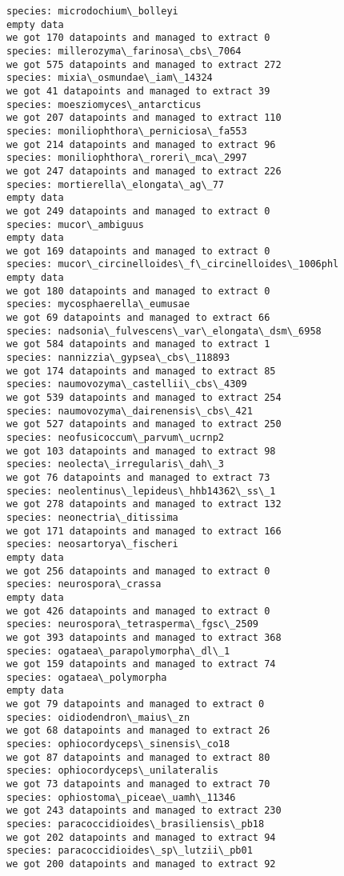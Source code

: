 \documentclass[11pt]{article}
\begin{document}
\begin{Verbatim}[commandchars=\\\{\}]
species: microdochium\_bolleyi
empty data
we got 170 datapoints and managed to extract 0
species: millerozyma\_farinosa\_cbs\_7064
we got 575 datapoints and managed to extract 272
species: mixia\_osmundae\_iam\_14324
we got 41 datapoints and managed to extract 39
species: moesziomyces\_antarcticus
we got 207 datapoints and managed to extract 110
species: moniliophthora\_perniciosa\_fa553
we got 214 datapoints and managed to extract 96
species: moniliophthora\_roreri\_mca\_2997
we got 247 datapoints and managed to extract 226
species: mortierella\_elongata\_ag\_77
empty data
we got 249 datapoints and managed to extract 0
species: mucor\_ambiguus
empty data
we got 169 datapoints and managed to extract 0
species: mucor\_circinelloides\_f\_circinelloides\_1006phl
empty data
we got 180 datapoints and managed to extract 0
species: mycosphaerella\_eumusae
we got 69 datapoints and managed to extract 66
species: nadsonia\_fulvescens\_var\_elongata\_dsm\_6958
we got 584 datapoints and managed to extract 1
species: nannizzia\_gypsea\_cbs\_118893
we got 174 datapoints and managed to extract 85
species: naumovozyma\_castellii\_cbs\_4309
we got 539 datapoints and managed to extract 254
species: naumovozyma\_dairenensis\_cbs\_421
we got 527 datapoints and managed to extract 250
species: neofusicoccum\_parvum\_ucrnp2
we got 103 datapoints and managed to extract 98
species: neolecta\_irregularis\_dah\_3
we got 76 datapoints and managed to extract 73
species: neolentinus\_lepideus\_hhb14362\_ss\_1
we got 278 datapoints and managed to extract 132
species: neonectria\_ditissima
we got 171 datapoints and managed to extract 166
species: neosartorya\_fischeri
empty data
we got 256 datapoints and managed to extract 0
species: neurospora\_crassa
empty data
we got 426 datapoints and managed to extract 0
species: neurospora\_tetrasperma\_fgsc\_2509
we got 393 datapoints and managed to extract 368
species: ogataea\_parapolymorpha\_dl\_1
we got 159 datapoints and managed to extract 74
species: ogataea\_polymorpha
empty data
we got 79 datapoints and managed to extract 0
species: oidiodendron\_maius\_zn
we got 68 datapoints and managed to extract 26
species: ophiocordyceps\_sinensis\_co18
we got 87 datapoints and managed to extract 80
species: ophiocordyceps\_unilateralis
we got 73 datapoints and managed to extract 70
species: ophiostoma\_piceae\_uamh\_11346
we got 243 datapoints and managed to extract 230
species: paracoccidioides\_brasiliensis\_pb18
we got 202 datapoints and managed to extract 94
species: paracoccidioides\_sp\_lutzii\_pb01
we got 200 datapoints and managed to extract 92

\end{Verbatim}
\end{document}
